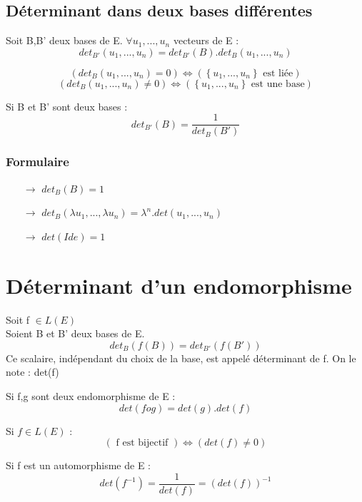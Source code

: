 \subsection{Déterminant dans deux bases différentes}
Soit B,B' deux bases de E. $\forall u_1,...,u_n $ vecteurs de E :
$$det_{B'}(u_1,...,u_n) = det_{B'}(B).det_B(u_1,...,u_n)$$
\begin{prop}
$$(det_B(u_1,...,u_n) = 0)\Leftrightarrow (\left\lbrace u_1,...,u_n \right\rbrace \mbox{ est liée}) $$
$$(det_B(u_1,...,u_n) \neq 0)\Leftrightarrow (\left\lbrace u_1,...,u_n \right\rbrace \mbox{ est une base}) $$
\end{prop}
\begin{prop}
 Si B et B' sont deux bases :
$$det_{B'}(B) = \dfrac{1}{det_B(B')}$$
\end{prop}
\subsubsection{Formulaire}
\begin{itemize}
 \item[$\rightarrow$] $det_B(B)=1$
 \item[$\rightarrow$] $det_B(\lambda u_1,...,\lambda u_n) = \lambda^n.det(u_1,...,u_n)$
 \item[$\rightarrow$] $det(Ide) = 1$
\end{itemize}
\section{Déterminant d'un endomorphisme}
\begin{de}
Soit f $\in L(E)$\\
Soient B et B' deux bases de E. 
$$det_B(f(B)) = det_{B'}(f(B'))$$
Ce scalaire, indépendant du choix de la base, est appelé déterminant de f. On le note : det(f) 
\end{de}
\begin{prop}
Si f,g sont deux endomorphisme de E :
$$det(fog) = det(g).det(f)$$
\end{prop}
\begin{prop}
Si $f \in L(E)$ :
$$(\mbox{ f est bijectif }) \Leftrightarrow ( det(f) \neq 0)$$
\end{prop}
\begin{prop}
Si f est un automorphisme de E : 
$$det(f^{-1})=\dfrac{1}{det(f)}=(det(f))^{-1}$$
\end{prop}
